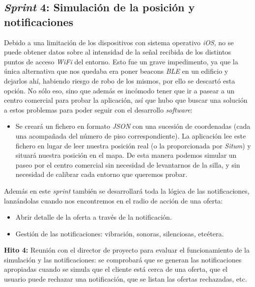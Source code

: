 \subsection{\textit{Sprint} 4: Simulación de la posición y notificaciones}
Debido a una limitación de los dispositivos con sistema operativo \textit{iOS}, no se puede obtener datos sobre al intensidad de la señal recibida de los distintos puntos de acceso \textit{WiFi} del entorno. Esto fue un grave impedimento, ya que la única alternativa que nos quedaba era poner beacons \textit{BLE} en un edificio y dejarlos ahí, habiendo riesgo de robo de los mismos, por ello se descartó esta opción. No sólo eso, sino que además es incómodo tener que ir a pasear a un centro comercial para probar la aplicación, así que hubo que buscar una solución a estos problemas para poder seguir con el desarrollo \textit{software}:
\begin{itemize}
\item Se creará un fichero en formato \textit{JSON} con una sucesión de coordenadas (cada una acompañada del número de piso correspondiente). La aplicación lee este fichero en lugar de leer nuestra posición real (o la proporcionada por \textit{Situm}) y situará nuestra posición en el mapa. De esta manera podemos simular un paseo por el centro comercial sin necesidad de levantarnos de la silla, y sin necesidad de calibrar cada entorno que queremos probar.
\end{itemize}
Además en este \textit{sprint} también se desarrollará toda la lógica de las notificaciones, lanzándolas cuando nos encontremos en el radio de acción de una oferta:
\begin{itemize}
\item Abrir detalle de la oferta a través de la notificación.
\item Gestión de las notificaciones: vibración, sonoras, silenciosas, etcétera.
\end{itemize}
\textbf{Hito 4:} Reunión con el director de proyecto para evaluar el funcionamiento de la simulación y las notificaciones: se comprobará que se generan las notificaciones apropiadas cuando se simula que el cliente está cerca de una oferta, que el usuario puede rechazar una notificación, que se listan las ofertas rechazadas, etc.

